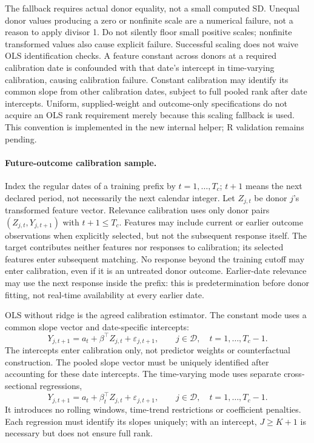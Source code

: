 \documentclass[11pt]{article}
\begin{document}
The fallback requires actual donor equality, not a small computed SD.
Unequal donor values producing a zero or nonfinite scale are a numerical
failure, not a reason to apply divisor 1. Do not silently floor small
positive scales; nonfinite transformed values also cause explicit failure.
Successful scaling does not waive OLS identification checks. A feature
constant across donors at a required calibration date is confounded with
that date's intercept in time-varying calibration, causing calibration
failure. Constant calibration may identify its common slope from other
calibration dates, subject to full pooled rank after date intercepts.
Uniform, supplied-weight and outcome-only specifications do not acquire
an OLS rank requirement merely because this scaling fallback is used.
This convention is implemented in the new internal helper; R validation
remains pending.

\paragraph{Future-outcome calibration sample.}
Index the regular dates of a training prefix by $t=1,\ldots,T_c$;
$t+1$ means the next declared period, not necessarily the next calendar
integer. Let $Z_{j,t}$ be donor $j$'s transformed feature vector. Relevance
calibration uses only donor pairs $(Z_{j,t},Y_{j,t+1})$ with
$t+1\leq T_c$. Features may include current or earlier outcome observations
when explicitly selected, but not the subsequent response itself.
The target contributes neither features nor responses to calibration;
its selected features enter subsequent matching. No response beyond the
training cutoff may enter calibration, even if it is an untreated donor
outcome. Earlier-date relevance may use the next response inside the
prefix: this is predetermination before donor fitting, not real-time
availability at every earlier date.

OLS without ridge is the agreed calibration estimator. The constant mode
uses a common slope vector and date-specific intercepts:
\[
 Y_{j,t+1}=a_t+\beta^\top Z_{j,t}+\varepsilon_{j,t+1},
 \qquad j\in\mathcal D,\quad t=1,\ldots,T_c-1.
\]
The intercepts enter calibration only, not predictor weights or
counterfactual construction. The pooled slope vector must be uniquely
identified after accounting for these date intercepts. The time-varying
mode uses separate cross-sectional regressions,
\[
 Y_{j,t+1}=a_t+\beta_t^\top Z_{j,t}+\varepsilon_{j,t+1},
 \qquad j\in\mathcal D,\quad t=1,\ldots,T_c-1.
\]
It introduces no rolling windows, time-trend restrictions or coefficient
penalties. Each regression must identify its slopes uniquely; with an
intercept, $J\geq K+1$ is necessary but does not ensure full rank.
\end{document}
